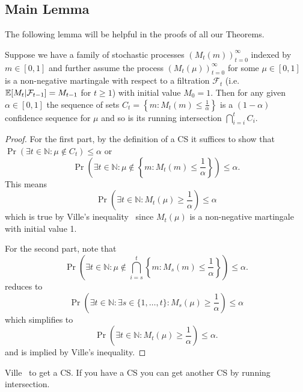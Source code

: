 \subsection{Main Lemma}
The following lemma will be helpful in the proofs of all our Theorems.
\begin{lemma}
\label{lem:main}
Suppose we have a family of stochastic processes 
$(M_t(m))_{t=0}^{\infty}$ indexed by $m \in [0,1]$ and further assume
the process $(M_t(\mu))_{t=0}^{\infty}$ for some $\mu \in [0,1]$ is a 
non-negative martingale with respect to a filtration $\mathcal{F}_t$ 
(i.e.\ $\mathbb{E}[M_t|\mathcal{F}_{t-1}]=M_{t-1}$ for $t \geq 1$)
with initial value $M_0=1$. Then for any given
$\alpha \in [0,1]$ the sequence of sets
$C_t = \left\{m: M_t(m) \leq \frac{1}{\alpha}\right\}$ is a 
$(1-\alpha)$ confidence sequence for $\mu$ and so is
its running intersection $\bigcap_{i=i}^t C_i$.
\end{lemma}
\begin{proof}
For the first part, by the definition of a CS it suffices to show that
$\Pr\left(\exists t \in \mathbb{N}: \mu \notin C_t\right) \leq \alpha$ or
\[
\Pr\left(\exists t \in \mathbb{N}: \mu \notin \left\{m: M_t(m) \leq \frac{1}{\alpha}\right\}\right) \leq \alpha.
\]
This means
\[
\Pr\left(\exists t \in \mathbb{N}: M_t(\mu) \geq \frac{1}{\alpha}\right) \leq \alpha 
\]
which is true by Ville's inequality~\cite{ville1939etude} since $M_t(\mu)$ is a 
non-negative martingale with initial value 1.

For the second part, note that
\[
\Pr\left(\exists t \in \mathbb{N}: \mu \notin \bigcap_{i=s}^t\left\{m: M_s(m) \leq \frac{1}{\alpha}\right\}\right) \leq \alpha.
\]
reduces to 
\[
\Pr\left(\exists t \in \mathbb{N}: \exists s\in \{1,\ldots,t\}: M_s(\mu) \geq \frac{1}{\alpha}\right) \leq \alpha
\]
which simplifies to
\[
\Pr\left(\exists t \in \mathbb{N}: M_t(\mu) \geq \frac{1}{\alpha}\right) \leq \alpha.
\]
and is implied by Ville's inequality.
\end{proof}

Ville~\cite{ville1939etude}
to get a CS.
If you have a CS you can get another CS by running intersection.

